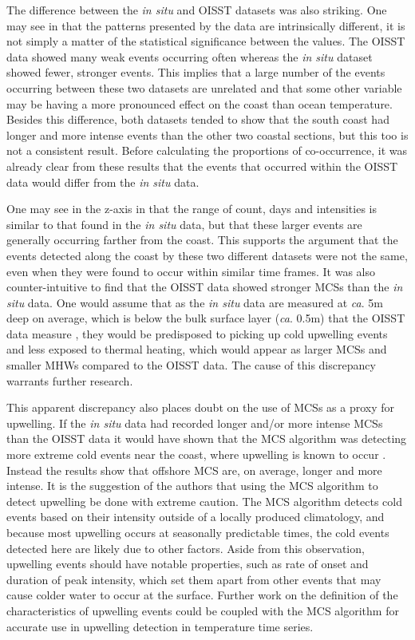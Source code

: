 \documentclass[a4paper,10pt,review]{elsarticle}
\begin{document}
The difference between the \emph{in situ} and OISST datasets was also striking. One may see in  that the patterns presented by the data are intrinsically different, it is not simply a matter of the statistical significance between the values. The OISST data showed many weak events occurring often whereas the \emph{in situ} dataset showed fewer, stronger events. This implies that a large number of the events occurring between these two datasets are unrelated and that some other variable may be having a more pronounced effect on the coast than ocean temperature. Besides this difference, both datasets tended to show that the south coast had longer and more intense events than the other two coastal sections, but this too is not a consistent result. Before calculating the proportions of co-occurrence, it was already clear from these results that the events that occurred within the OISST data would differ from the \emph{in situ} data.

One may see in the z-axis in  that the range of count, days and intensities is similar to that found in the \emph{in situ} data, but that these larger events are generally occurring farther from the coast. This supports the argument that the events detected along the coast by these two different datasets were not the same, even when they were found to occur within similar time frames. It was also counter-intuitive to find that the OISST data showed stronger MCSs than the \emph{in situ} data. One would assume that as the \emph{in situ} data are measured at \emph{ca}. 5m deep on average, which is below the bulk surface layer (\emph{ca}. 0.5m) that the OISST data measure \citep{Reynolds2002}, they would be predisposed to picking up cold upwelling events and less exposed to thermal heating, which would appear as larger MCSs and smaller MHWs compared to the OISST data. The cause of this discrepancy warrants further research.

This apparent discrepancy also places doubt on the use of MCSs as a proxy for upwelling. If the \emph{in situ} data had recorded longer and/or more intense MCSs than the OISST data it would have shown that the MCS algorithm was detecting more extreme cold events near the coast, where upwelling is known to occur \citep{Lutjeharms2000, Hutchings2009}. Instead the results show that offshore MCS are, on average, longer and more intense. It is the suggestion of the authors that using the MCS algorithm to detect upwelling be done with extreme caution. The MCS algorithm detects cold events based on their intensity outside of a locally produced climatology, and because most upwelling occurs at seasonally predictable times, the cold events detected here are likely due to other factors. Aside from this observation, upwelling events should have notable properties, such as rate of onset and duration of peak intensity, which set them apart from other events that may cause colder water to occur at the surface. Further work on the definition of the characteristics of upwelling events could be coupled with the MCS algorithm for accurate use in upwelling detection in temperature time series.
\end{document}
